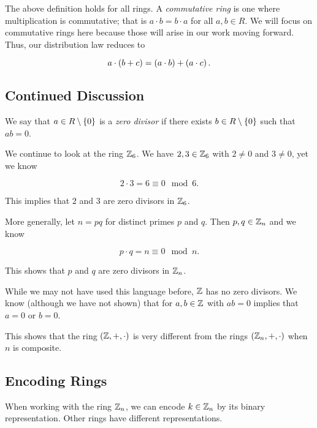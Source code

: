 The above definition holds for all rings.
A \emph{\gls{commutative ring}} is one where multiplication
is \gls{commutative};
that is $a\cdot b = b\cdot a$ for all $a,b\in R$.
We will focus on \glspl{commutative ring} here because those will arise
in our work moving forward.
Thus, our distribution law reduces to 

\begin{equation}
    a\cdot\left( b + c \right) = \left( a\cdot b \right) + \left( a\cdot c \right).
\end{equation}

\subsection{Continued Discussion}

We say that  $a\in R\setminus\left\{ 0 \right\}$ is a \emph{zero divisor}
if there exists $b\in R\setminus\left\{ 0 \right\}$ such that $ab = 0$.

\begin{example}
We continue to look at the \gls{ring} $\mathbb{Z}_{6}$.
We have $2,3\in\mathbb{Z}_{6}$ with $2\ne0$ and $3\ne0$, yet we know

\begin{equation}
    2\cdot 3 = 6 \equiv 0 \mod 6.
\end{equation}

\noindent
This implies that $2$ and $3$ are zero divisors in $\mathbb{Z}_{6}$.

More generally, let $n = pq$ for distinct primes $p$ and $q$.
Then $p,q\in\mathbb{Z}_{n}$ and we know

\begin{equation}
    p\cdot q = n \equiv 0 \mod n.
\end{equation}

\noindent
This shows that $p$ and $q$ are zero divisors in $\mathbb{Z}_{n}$.
\end{example}

\begin{example}
While we may not have used this language before,
$\mathbb{Z}$ has no zero divisors.
We know (although we have not shown) that for $a,b\in\mathbb{Z}$ with
$ab = 0$ implies that $a=0$ or $b=0$.

This shows that the \gls{ring} $\left( \mathbb{Z},+,\cdot \right)$
is very different from the \glspl{ring} $\left( \mathbb{Z}_{n},+,\cdot \right)$
when $n$ is composite.
\end{example}

\subsection{Encoding Rings}

When working with the \gls{ring} $\mathbb{Z}_{n}$, we can encode $k\in\mathbb{Z}_{n}$
by its binary representation.
Other rings have different representations.
